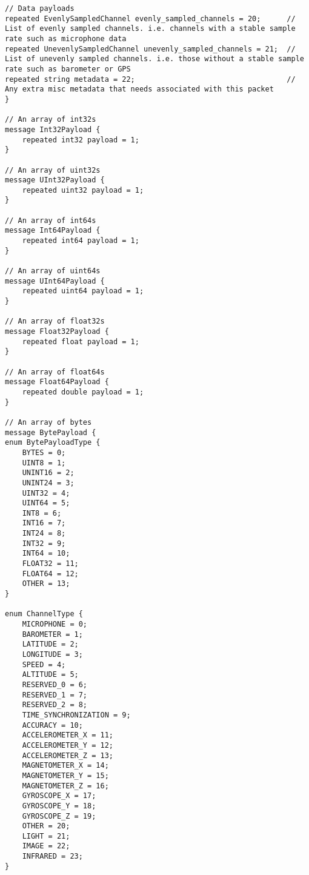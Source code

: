 \begin{lstlisting}
// Data payloads
repeated EvenlySampledChannel evenly_sampled_channels = 20;      // List of evenly sampled channels. i.e. channels with a stable sample rate such as microphone data
repeated UnevenlySampledChannel unevenly_sampled_channels = 21;  // List of unevenly sampled channels. i.e. those without a stable sample rate such as barometer or GPS
repeated string metadata = 22;                                   // Any extra misc metadata that needs associated with this packet
}

// An array of int32s
message Int32Payload {
	repeated int32 payload = 1;
}

// An array of uint32s
message UInt32Payload {
	repeated uint32 payload = 1;
}

// An array of int64s
message Int64Payload {
	repeated int64 payload = 1;
}

// An array of uint64s
message UInt64Payload {
	repeated uint64 payload = 1;
}

// An array of float32s
message Float32Payload {
	repeated float payload = 1;
}

// An array of float64s
message Float64Payload {
	repeated double payload = 1;
}

// An array of bytes
message BytePayload {
enum BytePayloadType {
	BYTES = 0;
	UINT8 = 1;
	UNINT16 = 2;
	UNINT24 = 3;
	UINT32 = 4;
	UINT64 = 5;
	INT8 = 6;
	INT16 = 7;
	INT24 = 8;
	INT32 = 9;
	INT64 = 10;
	FLOAT32 = 11;
	FLOAT64 = 12;
	OTHER = 13;
}

enum ChannelType {
	MICROPHONE = 0;
	BAROMETER = 1;
	LATITUDE = 2;
	LONGITUDE = 3;
	SPEED = 4;
	ALTITUDE = 5;
	RESERVED_0 = 6;
	RESERVED_1 = 7;
	RESERVED_2 = 8;
	TIME_SYNCHRONIZATION = 9;
	ACCURACY = 10;
	ACCELEROMETER_X = 11;
	ACCELEROMETER_Y = 12;
	ACCELEROMETER_Z = 13;
	MAGNETOMETER_X = 14;
	MAGNETOMETER_Y = 15;
	MAGNETOMETER_Z = 16;
	GYROSCOPE_X = 17;
	GYROSCOPE_Y = 18;
	GYROSCOPE_Z = 19;
	OTHER = 20;
	LIGHT = 21;
	IMAGE = 22;
	INFRARED = 23;
}


\end{lstlisting}
